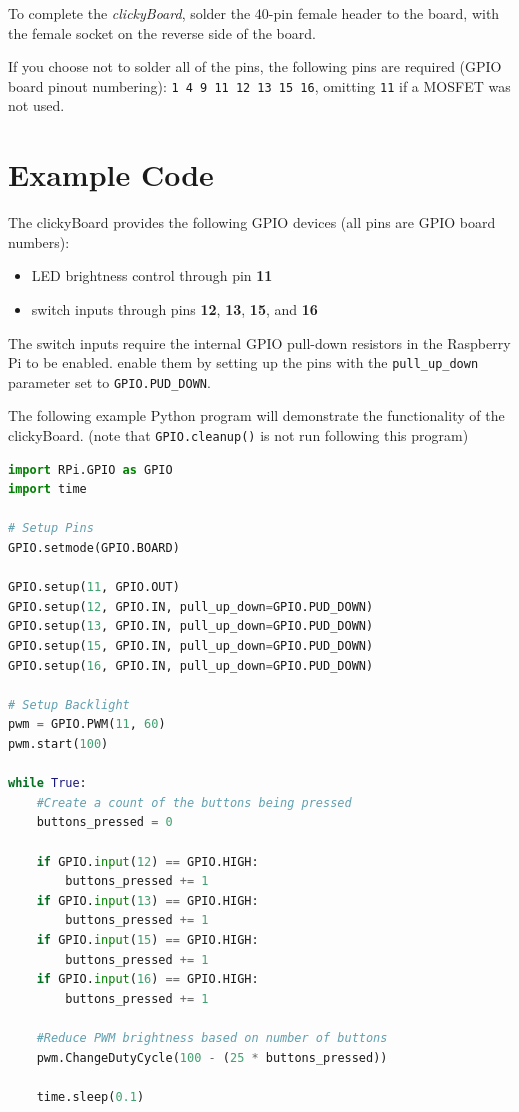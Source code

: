 \documentclass[10pt, a4paper, onesided]{article}
\begin{document}
		To complete the \textit{clickyBoard}, solder the 40-pin female header to the board, with the female socket on the reverse side of the board.
		
		If you choose not to solder all of the pins, the following pins are required (GPIO board pinout numbering): 
		\texttt{1 4 9 11 12 13 15 16}, omitting \texttt{11} if a MOSFET was not used.


\newpage
\section{Example Code}

The clickyBoard provides the following GPIO devices (all pins are GPIO board numbers):

\begin{itemize}[nosep]
	\item LED brightness control through pin \textbf{11}
	\item switch inputs through pins \textbf{12}, \textbf{13}, \textbf{15}, and \textbf{16}
\end{itemize}

The switch inputs require the internal GPIO pull-down resistors in the Raspberry Pi to be enabled. enable them by setting up the pins with the \texttt{pull\_up\_down} parameter set to \texttt{GPIO.PUD\_DOWN}.

The following example Python program will demonstrate the functionality of the clickyBoard. (note that \texttt{GPIO.cleanup()} is not run following this program)

\begin{lstlisting}[language=Python,title=clickyboardtest.py]
import RPi.GPIO as GPIO
import time

# Setup Pins
GPIO.setmode(GPIO.BOARD)

GPIO.setup(11, GPIO.OUT)
GPIO.setup(12, GPIO.IN, pull_up_down=GPIO.PUD_DOWN)
GPIO.setup(13, GPIO.IN, pull_up_down=GPIO.PUD_DOWN)
GPIO.setup(15, GPIO.IN, pull_up_down=GPIO.PUD_DOWN)
GPIO.setup(16, GPIO.IN, pull_up_down=GPIO.PUD_DOWN)

# Setup Backlight
pwm = GPIO.PWM(11, 60)
pwm.start(100)

while True:
	#Create a count of the buttons being pressed
	buttons_pressed = 0
	
	if GPIO.input(12) == GPIO.HIGH:
		buttons_pressed += 1
	if GPIO.input(13) == GPIO.HIGH:
		buttons_pressed += 1
	if GPIO.input(15) == GPIO.HIGH:
		buttons_pressed += 1
	if GPIO.input(16) == GPIO.HIGH:
		buttons_pressed += 1
	
	#Reduce PWM brightness based on number of buttons
	pwm.ChangeDutyCycle(100 - (25 * buttons_pressed))
	
	time.sleep(0.1)
	
\end{lstlisting}
\end{document}
